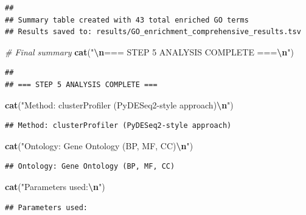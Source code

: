 \documentclass[
]{article}
\newenvironment{Shaded}{\begin{snugshade}}{\end{snugshade}}
\newcommand{\CommentTok}[1]{\textcolor[rgb]{0.56,0.35,0.01}{\textit{#1}}}
\newcommand{\FunctionTok}[1]{\textcolor[rgb]{0.13,0.29,0.53}{\textbf{#1}}}
\newcommand{\NormalTok}[1]{#1}
\newcommand{\SpecialCharTok}[1]{\textcolor[rgb]{0.81,0.36,0.00}{\textbf{#1}}}
\newcommand{\StringTok}[1]{\textcolor[rgb]{0.31,0.60,0.02}{#1}}
\begin{document}
\begin{verbatim}
## 
## Summary table created with 43 total enriched GO terms
## Results saved to: results/GO_enrichment_comprehensive_results.tsv
\end{verbatim}

\begin{Shaded}
\begin{Highlighting}[]
\CommentTok{\# Final summary}
\FunctionTok{cat}\NormalTok{(}\StringTok{"}\SpecialCharTok{\textbackslash{}n}\StringTok{=== STEP 5 ANALYSIS COMPLETE ===}\SpecialCharTok{\textbackslash{}n}\StringTok{"}\NormalTok{)}
\end{Highlighting}
\end{Shaded}

\begin{verbatim}
## 
## === STEP 5 ANALYSIS COMPLETE ===
\end{verbatim}

\begin{Shaded}
\begin{Highlighting}[]
\FunctionTok{cat}\NormalTok{(}\StringTok{"Method: clusterProfiler (PyDESeq2{-}style approach)}\SpecialCharTok{\textbackslash{}n}\StringTok{"}\NormalTok{)}
\end{Highlighting}
\end{Shaded}

\begin{verbatim}
## Method: clusterProfiler (PyDESeq2-style approach)
\end{verbatim}

\begin{Shaded}
\begin{Highlighting}[]
\FunctionTok{cat}\NormalTok{(}\StringTok{"Ontology: Gene Ontology (BP, MF, CC)}\SpecialCharTok{\textbackslash{}n}\StringTok{"}\NormalTok{)}
\end{Highlighting}
\end{Shaded}

\begin{verbatim}
## Ontology: Gene Ontology (BP, MF, CC)
\end{verbatim}

\begin{Shaded}
\begin{Highlighting}[]
\FunctionTok{cat}\NormalTok{(}\StringTok{"Parameters used:}\SpecialCharTok{\textbackslash{}n}\StringTok{"}\NormalTok{)}
\end{Highlighting}
\end{Shaded}

\begin{verbatim}
## Parameters used:
\end{verbatim}
\end{document}
